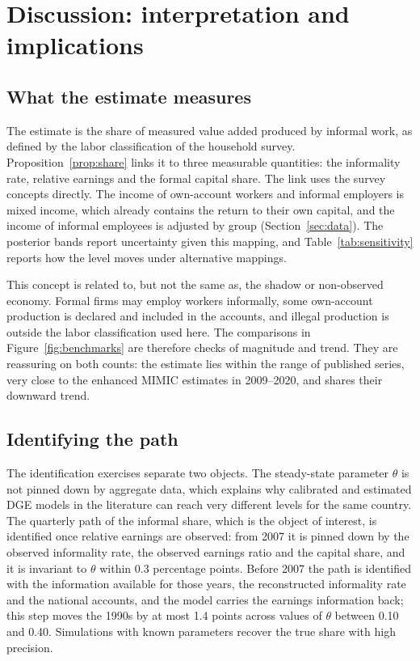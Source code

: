 \section{Discussion: interpretation and implications}
\label{sec:discussion}

\subsection{What the estimate measures}

The estimate is the share of measured value added produced by informal work, as defined by the labor classification of the household survey. Proposition~\ref{prop:share} links it to three measurable quantities: the informality rate, relative earnings and the formal capital share. The link uses the survey concepts directly. The income of own-account workers and informal employers is mixed income, which already contains the return to their own capital, and the income of informal employees is adjusted by group (Section~\ref{sec:data}). The posterior bands report uncertainty given this mapping, and Table~\ref{tab:sensitivity} reports how the level moves under alternative mappings.

This concept is related to, but not the same as, the shadow or non-observed economy. Formal firms may employ workers informally, some own-account production is declared and included in the accounts, and illegal production is outside the labor classification used here. The comparisons in Figure~\ref{fig:benchmarks} are therefore checks of magnitude and trend. They are reassuring on both counts: the estimate lies within the range of published series, very close to the enhanced MIMIC estimates in 2009--2020, and shares their downward trend.

\subsection{Identifying the path}

The identification exercises separate two objects. The steady-state parameter $\theta$ is not pinned down by aggregate data, which explains why calibrated and estimated DGE models in the literature can reach very different levels for the same country. The quarterly path of the informal share, which is the object of interest, is identified once relative earnings are observed: from 2007 it is pinned down by the observed informality rate, the observed earnings ratio and the capital share, and it is invariant to $\theta$ within 0.3 percentage points. Before 2007 the path is identified with the information available for those years, the reconstructed informality rate and the national accounts, and the model carries the earnings information back; this step moves the 1990s by at most 1.4 points across values of $\theta$ between 0.10 and 0.40. Simulations with known parameters recover the true share with high precision.

